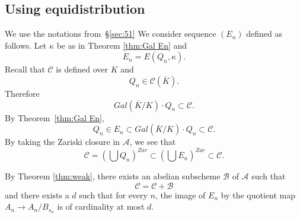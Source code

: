 \documentclass[12pt]{amsart}
\newcommand{\ol}{\overline}
\begin{document}
%

\subsection{Using equidistribution}
We use the notations from~\S\ref{sec:51}
We consider sequence $(E_n)$ defined as follows. Let $\kappa$ be as in Theorem \ref{thm:Gal En} and 
$$
E_n = E(Q_n, \kappa).
$$
Recall that $\mathcal{C}$ is defined over $K$ and 
$$
Q_n \in \mathcal{C}(\overline{K}).
$$
Therefore 
$$
Gal(\overline{K}/K) \cdot Q_n \subset \mathcal{C}.
$$
By Theorem~\ref{thm:Gal En},
$$
Q_n \in E_n \subset Gal(\overline{K}/K) \cdot Q_n \subset \mathcal{C}.
$$
By taking the Zariski closure in $\mathcal{A}$, we see that
$$
\mathcal{C}=(\bigcup Q_n)^{Zar} \subset (\bigcup E_n)^{Zar} \subset \mathcal{C}.
$$ 

By Theorem \ref{thm:weak}, there exists an abelian subscheme $\mathcal{B}$ of $\mathcal{A}$
such that
$$
\mathcal{C} = \mathcal{C} + \mathcal{B}
$$
and there exists a $d$ such that for every $n$, the image of $E_n$ by the quotient map
$A_n \to A_n/B_{s_n}$ is of cardinality at most $d$.
\end{document}
